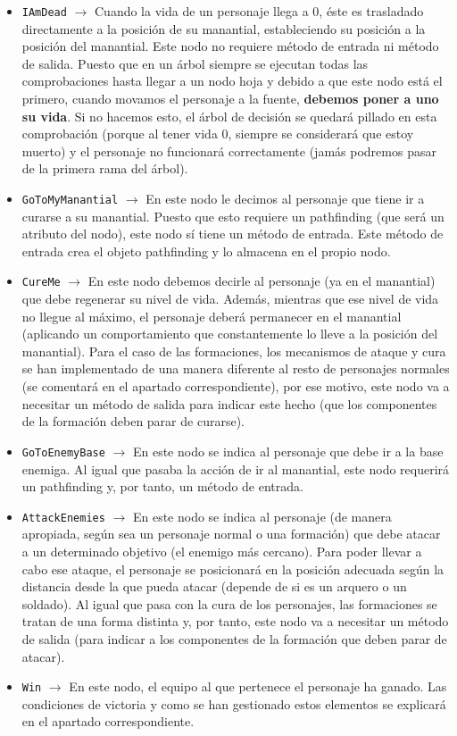 \begin{itemize}
	\item \texttt{IAmDead} $\rightarrow$ Cuando la vida de un personaje llega a 0, éste es trasladado directamente a la posición de su manantial, estableciendo su posición a la posición del manantial. Este nodo no requiere método de entrada ni método de salida. Puesto que en un árbol siempre se ejecutan todas las comprobaciones hasta llegar a un nodo hoja y debido a que este nodo está el primero, cuando movamos el personaje a la fuente, \textbf{debemos poner a uno su vida}. Si no hacemos esto, el árbol de decisión se quedará pillado en esta comprobación (porque al tener vida 0, siempre se considerará que estoy muerto) y el personaje no funcionará correctamente (jamás podremos pasar de la primera rama del árbol).
	\item \texttt{GoToMyManantial} $\rightarrow$ En este nodo le decimos al personaje que tiene ir a curarse a su manantial. Puesto que esto requiere un pathfinding (que será un atributo del nodo), este nodo sí tiene un método de entrada. Este método de entrada crea el objeto pathfinding y lo almacena en el propio nodo.
	\item \texttt{CureMe} $\rightarrow$ En este nodo debemos decirle al personaje (ya en el manantial) que debe regenerar su nivel de vida. Además, mientras que ese nivel de vida no llegue al máximo, el personaje deberá permanecer en el manantial (aplicando un comportamiento que constantemente lo lleve a la posición del manantial). Para el caso de las formaciones, los mecanismos de ataque y cura se han implementado de una manera diferente al resto de personajes normales (se comentará en el apartado correspondiente), por ese motivo, este nodo va a necesitar un método de salida para indicar este hecho (que los componentes de la formación deben parar de curarse).
	\item \texttt{GoToEnemyBase} $\rightarrow$ En este nodo se indica al personaje que debe ir a la base enemiga. Al igual que pasaba la acción de ir al manantial, este nodo requerirá un pathfinding y, por tanto, un método de entrada.
	\item \texttt{AttackEnemies} $\rightarrow$ En este nodo se indica al personaje (de manera apropiada, según sea un personaje normal o una formación) que debe atacar a un determinado objetivo (el enemigo más cercano). Para poder llevar a cabo ese ataque, el personaje se posicionará en la posición adecuada según la distancia desde la que pueda atacar (depende de si es un arquero o un soldado). Al igual que pasa con la cura de los personajes, las formaciones se tratan de una forma distinta y, por tanto, este nodo va a necesitar un método de salida (para indicar a los componentes de la formación que deben parar de atacar).
	\item \texttt{Win} $\rightarrow$ En este nodo, el equipo al que pertenece el personaje ha ganado. Las condiciones de victoria y como se han gestionado estos elementos se explicará en el apartado correspondiente.
\end{itemize}

